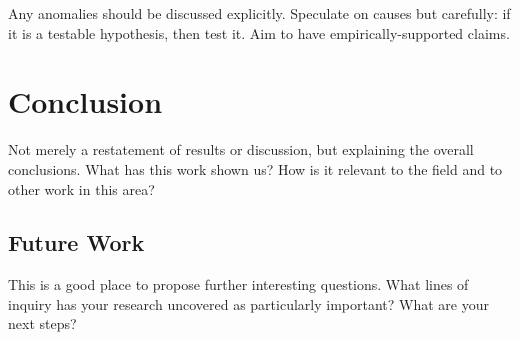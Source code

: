 \documentclass{article} %
\begin{document}
Any anomalies should be discussed explicitly. Speculate on causes but carefully: if it is a testable hypothesis, then test it. Aim to have empirically-supported claims.

\section{Conclusion}
Not merely a restatement of results or discussion, but explaining the overall conclusions. What has this work shown us? How is it relevant to the field and to other work in this area?

\subsection{Future Work}
\label{sec:future}
This is a good place to propose further interesting questions. What lines of inquiry has your research uncovered as particularly important? What are your next steps?




\end{document}
